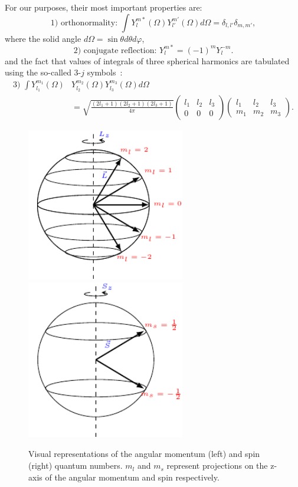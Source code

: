 For our purposes, their most important properties are:
\begin{equation}
	\text{1) orthonormality: } \int Y_l^{m*}(\Omega) Y_{l'}^{m'} (\Omega) d\Omega=\delta_{l,l'}\delta_{m,m'},
\end{equation}
where the solid angle $d\Omega = \sin \theta d\theta d\varphi$,
\begin{equation}
\text{2) conjugate reflection: } Y_l^{m*} = (-1)^m Y_l^{-m}.
\end{equation}
and the fact that values of integrals of three spherical harmonics are tabulated using the so-called 3-$j$ symbols~\cite{cowan1981theory}: 
  \begin{align} \label{3jInt}
\text{3)  }	\int Y_{l_{1}}^{m_{1}}(\Omega)& Y_{l_{2}}^{m_{2}}(\Omega)
	Y_{l_{3}}^{m_{3}}(\Omega) d\Omega \nonumber \\
	&=
	\sqrt{\frac{(2l_1+1)(2l_2+1)(2l_3+1)}{4 \pi}}
	\begin{pmatrix} l_1 & l_2 & l_3 \\ 0 & 0 & 0 \end{pmatrix}
	\begin{pmatrix}l_1 & l_2 & l_3\\ m_1 & m_2 & m_3 \end{pmatrix}.
\end{align}

\begin{figure} [t] 
	\centering
	\includegraphics[width=69mm]{Graphs/AngularMomentum.pdf} 
	\includegraphics[width=69mm]{Graphs/Spin.pdf} 
	\caption{Visual representations of the angular momentum (left) and spin (right) quantum numbers. $m_l$ and $m_s$ represent projections on the z-axis of the angular momentum and spin respectively.} \label{AngMomFig}
\end{figure}


